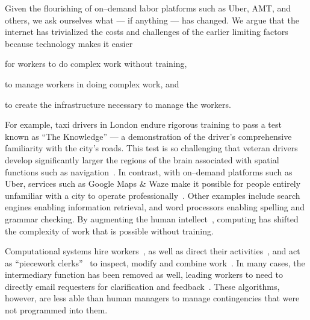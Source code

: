 \documentclass[trackingWork]{subfiles}
\begin{document}
Given the flourishing of on--demand labor platforms such as
Uber, AMT, and others, we ask ourselves
what --- if anything --- has changed.
We argue that
the internet has trivialized
the costs and challenges of the earlier limiting factors
because technology makes it easier
\begin{inlinelist}
  \item for workers to do complex work without training,
  \item to manage workers in doing complex work, and 
  \item to create the infrastructure necessary to manage the workers.
\end{inlinelist}

For example, taxi drivers in London endure rigorous training to pass a test known as ``The Knowledge''
--- a demonstration of the driver's comprehensive familiarity with the city's roads.
This test is so challenging that veteran drivers develop significantly larger
the regions of the brain associated with spatial functions such as navigation~\cite{Maguire11042000,Maguire2894,Skok:1999:KML:299513.299625,skok2000managing,Woollett1407,woollett2011acquiring}.
In contrast, with on--demand platforms such as Uber, services such as Google Maps \& Waze make it possible for
people entirely unfamiliar with a city
to operate professionally~\cite{silva2013traffic,hind2014outsmarting}.
Other examples include search engines enabling information retrieval, and
word processors enabling spelling and grammar checking.
By augmenting the human intellect~\cite{engelbart2001augmenting},
computing has shifted the complexity of work that is possible without training.

Computational systems hire workers~\cite{turkitLittle,weld2010decision}, as well as direct their activities~\cite{uberAlgorithm}, and act as ``piecework clerks''~\cite{10.2307/23702539} to inspect, modify and combine work~\cite{turkopticon,takingAHITMcInnis}.
In many cases, the intermediary function has been removed as well, leading workers to need to directly email requesters for clarification and feedback~\cite{martin2014being}.
These algorithms, however, are less able than human managers to manage contingencies that were not programmed into them.
\end{document}
